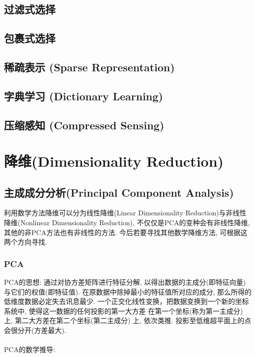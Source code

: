 \documentclass[oneside]{book}
\begin{document}
				\subsection{过滤式选择}

				\subsection{包裹式选择}

				\subsection{稀疏表示 (Sparse Representation)}

				\subsection{字典学习 (Dictionary Learning)}

				\subsection{压缩感知 (Compressed Sensing)}

		\section{降维(Dimensionality Reduction)}
				\subsection{主成成分分析(Principal Component Analysis)}
					利用数学方法降维可以分为线性降维(Linear Dimensionality Reduction)与非线性降维(Nonlinear Dimensionality Reduction), 不仅仅是PCA的变种会有非线性降维, 其他的非PCA方法也有非线性的方法. 今后若要寻找其他数学降维方法, 可根据这两个方向寻找.
					\subsubsection{PCA \NovaMonoFont{[Linear]}}
					PCA的思想: 通过对协方差矩阵进行特征分解, 以得出数据的主成分(即特征向量) 与它们的权值(即特征值).
					在原数据中除掉最小的特征值所对应的成分, 那么所得的低维度数据必定失去讯息最少.
					一个正交化线性变换，把数据变换到一个新的坐标系统中, 使得这一数据的任何投影的第一大方差
					在第一个坐标(称为第一主成分) 上, 第二大方差在第二个坐标(第二主成分) 上, 依次类推.
					投影至低维超平面上的点会很分开(方差最大).\\ \\
					PCA的数学推导:\\
\end{document}
